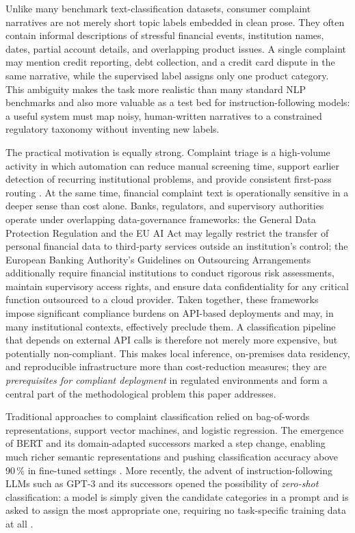 \documentclass[10pt,a4paper,twocolumn]{article}
\begin{document}
Unlike many benchmark text-classification datasets, consumer complaint
narratives are not merely short topic labels embedded in clean prose.
They often contain informal descriptions of stressful financial events,
institution names, dates, partial account details, and overlapping
product issues. A single complaint may mention credit reporting, debt
collection, and a credit card dispute in the same narrative, while the
supervised label assigns only one product category. This ambiguity makes
the task more realistic than many standard NLP benchmarks and also more
valuable as a test bed for instruction-following models: a useful system
must map noisy, human-written narratives to a constrained regulatory
taxonomy without inventing new labels.

The practical motivation is equally strong. Complaint triage is a
high-volume activity in which automation can reduce manual screening
time, support earlier detection of recurring institutional problems,
and provide consistent first-pass routing \cite{di2023complaint}.
At the same time, financial complaint text is operationally sensitive
in a deeper sense than cost alone. Banks, regulators, and supervisory
authorities operate under overlapping data-governance frameworks:
the General Data Protection Regulation \cite{gdpr2016} and the EU AI
Act \cite{euaiact2024} may legally restrict the transfer of personal
financial data to third-party services outside an institution's control;
the European Banking Authority's Guidelines on Outsourcing Arrangements
\cite{eba2019outsourcing} additionally require financial institutions to
conduct rigorous risk assessments, maintain supervisory access rights, and
ensure data confidentiality for any critical function outsourced to a cloud
provider. Taken together, these frameworks impose significant compliance
burdens on API-based deployments and may, in many institutional contexts,
effectively preclude them. A classification pipeline that depends on
external API calls is therefore not merely more expensive, but potentially
non-compliant. This makes local inference, on-premises data residency, and
reproducible infrastructure more than cost-reduction measures; they are
\emph{prerequisites for compliant deployment} in regulated environments
and form a central part of the methodological problem this paper addresses.

Traditional approaches to complaint classification relied on
bag-of-words representations, support vector machines, and logistic
regression. The emergence of BERT \cite{devlin2019bert} and its
domain-adapted successors marked a step change, enabling much richer
semantic representations and pushing classification accuracy above
90\,\% in fine-tuned settings \cite{vairetti2024bert}. More recently,
the advent of instruction-following LLMs such as GPT-3 \cite{brown2020gpt3}
and its successors opened the possibility of \emph{zero-shot}
classification: a model is simply given the candidate categories in
a prompt and is asked to assign the most appropriate one, requiring
no task-specific training data at all
\cite{kojima2022zeroshotcot,madanchian2024genai}.
\end{document}
